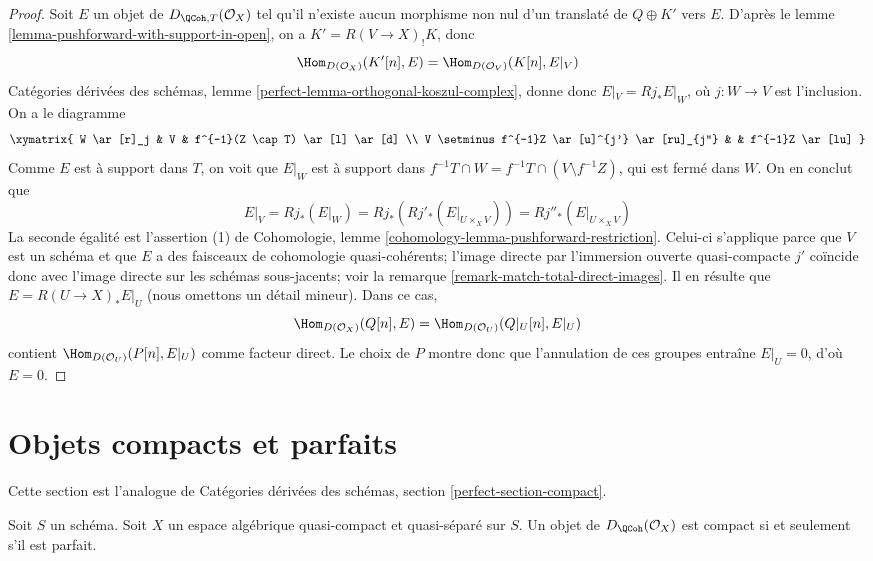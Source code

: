 \begin{proof}
\medskip\noindent
Soit $E$ un objet de $D_{\QCoh,T}(\mathcal{O}_X)$ tel qu'il n'existe aucun
morphisme non nul d'un translat\'e de $Q\oplus K'$ vers $E$. D'apr\`es le lemme
\ref{lemma-pushforward-with-support-in-open}, on a
$K'=R(V\to X)_!K$, donc
$$
\Hom_{D(\mathcal{O}_X)}(K'[n], E) = \Hom_{D(\mathcal{O}_V)}(K[n], E|_V)
$$
Cat\'egories d\'eriv\'ees des sch\'emas, lemme
\ref{perfect-lemma-orthogonal-koszul-complex}, donne donc
$E|_V=Rj_*E|_W$, o\`u $j:W\to V$ est l'inclusion. On a le diagramme
$$
\xymatrix{
W \ar[r]_j & V & f^{-1}(Z \cap T) \ar[l] \ar[d] \\
V \setminus f^{-1}Z \ar[u]^{j'} \ar[ru]_{j''} & & f^{-1}Z \ar[lu]
}
$$
Comme $E$ est \`a support dans $T$, on voit que $E|_W$ est \`a support dans
$f^{-1}T\cap W=f^{-1}T\cap(V\setminus f^{-1}Z)$, qui est ferm\'e dans $W$.
On en conclut que
$$
E|_V = Rj_*(E|_W) = Rj_*(Rj'_*(E|_{U \times_X V})) =
Rj''_*(E|_{U \times_X V})
$$
La seconde \'egalit\'e est l'assertion (1) de Cohomologie, lemme
\ref{cohomology-lemma-pushforward-restriction}. Celui-ci s'applique parce que
$V$ est un sch\'ema et que $E$ a des faisceaux de cohomologie quasi-coh\'erents;
l'image directe par l'immersion ouverte quasi-compacte $j'$ co\"incide donc
avec l'image directe sur les sch\'emas sous-jacents; voir la remarque
\ref{remark-match-total-direct-images}. Il en r\'esulte que
$E=R(U\to X)_*E|_U$ (nous omettons un d\'etail mineur). Dans ce cas,
$$
\Hom_{D(\mathcal{O}_X)}(Q[n], E) = \Hom_{D(\mathcal{O}_U)}(Q|_U[n], E|_U)
$$
contient $\Hom_{D(\mathcal{O}_U)}(P[n],E|_U)$ comme facteur direct. Le choix
de $P$ montre donc que l'annulation de ces groupes entra\^ine $E|_U=0$, d'o\`u
$E=0$.
\end{proof}










\section{Objets compacts et parfaits}
\label{section-compact}

\noindent
Cette section est l'analogue de
Cat\'egories d\'eriv\'ees des sch\'emas, section \ref{perfect-section-compact}.

\begin{proposition}
\label{proposition-compact-is-perfect}
Soit $S$ un sch\'ema.
Soit $X$ un espace alg\'ebrique quasi-compact et quasi-s\'epar\'e sur $S$.
Un objet de $D_\QCoh(\mathcal{O}_X)$ est compact
si et seulement s'il est parfait.
\end{proposition}

